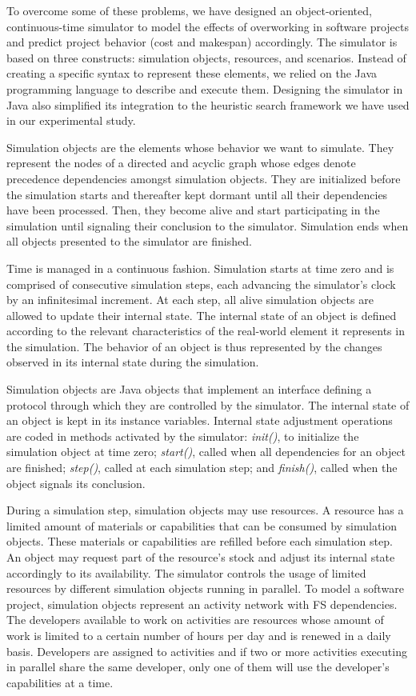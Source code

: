 \documentclass[conference]{IEEEtran}
\begin{document}
To overcome some of these problems, we have designed an object-oriented, continuous-time simulator to model the effects of overworking in software projects and predict project behavior (cost and makespan) accordingly. The simulator is based on three constructs: simulation objects, resources, and scenarios. Instead of creating a specific syntax to represent these elements, we relied on the Java programming language to describe and execute them. Designing the simulator in Java also simplified its integration to the heuristic search framework we have used in our experimental study.

Simulation objects are the elements whose behavior we want to simulate. They represent the nodes of a directed and acyclic graph whose edges denote precedence dependencies amongst simulation objects. They are initialized before the simulation starts and thereafter kept dormant until all their dependencies have been processed. Then, they become alive and start participating in the simulation until signaling their conclusion to the simulator. Simulation ends when all objects presented to the simulator are finished.

Time is managed in a continuous fashion. Simulation starts at time zero and is comprised of consecutive simulation steps, each advancing the simulator's clock by an infinitesimal increment. At each step, all alive simulation objects are allowed to update their internal state. The internal state of an object is defined according to the relevant characteristics of the real-world element it represents in the simulation. The behavior of an object is thus represented by the changes observed in its internal state during the simulation.

Simulation objects are Java objects that implement an interface defining a protocol through which they are controlled by the simulator. The internal state of an object is kept in its instance variables. Internal state adjustment operations are coded in methods activated by the simulator: \textit{init()}, to initialize the simulation object at time zero; \textit{start()}, called when all dependencies for an object are finished; \textit{step()}, called at each simulation step; and \textit{finish()}, called when the object signals its conclusion.

During a simulation step, simulation objects may use resources. A resource has a limited amount of materials or capabilities that can be consumed by simulation objects. These materials or capabilities are refilled before each simulation step. An object may request part of the resource's stock and adjust its internal state accordingly to its availability. The simulator controls the usage of limited resources by different simulation objects running in parallel. To model a software project, simulation objects represent an activity network with FS dependencies. The developers available to work on activities are resources whose amount of work is limited to a certain number of hours per day and is renewed in a daily basis. Developers are assigned to activities and if two or more activities executing in parallel share the same developer, only one of them will use the developer's capabilities at a time.
\end{document}
